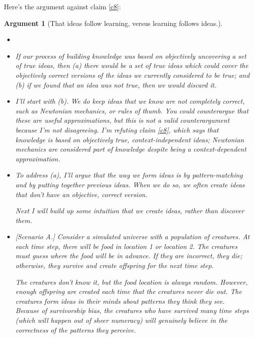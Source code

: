 \documentclass[11pt, oneside]{article}   	%
\newtheorem{argt}{Argument}
\begin{document}
Here's the argument against claim \ref{c8}:
\begin{argt}[That ideas follow learning, versus learning follows ideas.]
    \label{a6}
    \normalfont
\begin{itemize}
    \item[]

    \item{} If our process of building knowledge was based on objectively
        uncovering a set of true ideas, then (a) there would be a set of true
        ideas which could cover the objectively correct versions of the ideas we
        currently considered to be true; and (b) if we found that an idea was
        not true, then we would discard it.

    \item{} I'll start with (b). We do keep ideas that we know are not
        completely correct, such as Newtonian mechanics, or rules of thumb.
        You could counterargue that these are useful approximations, but this is
        not a valid counterargument because I'm not disagreeing.
        I'm refuting claim \ref{c8}, which says that knowledge is based on
        objectively true, context-independent ideas; Newtonian mechanics are
        considered part of knowledge despite being a context-dependent
        approximation.

    \item{} To address (a), I'll argue that the way we form ideas is by
        pattern-matching and by putting together previous ideas. When we do so,
        we often create ideas that don't have an objective, correct version.

        Next I will build up some intuition that we create ideas, rather than
        discover them.

    \item{} [Scenario A.] Consider a simulated universe with a
        population of creatures. At each time step, there will be food in
        location 1 or location 2. The creatures must guess where the food will
        be in advance. If they are incorrect, they die; otherwise, they survive
        and create offspring for the next time step.

        The creatures don't know it, but the food location is always random.
        However, enough offspring are created each time that the creatures never
        die out. The creatures form ideas in their minds about patterns they
        think
        they see. Because of survivorship bias, the creatures who have survived
        many time steps (which will happen out of sheer numeracy) will genuinely
        believe in the correctness of the patterns they perceive.


\end{itemize}
\end{argt}
\end{document}
